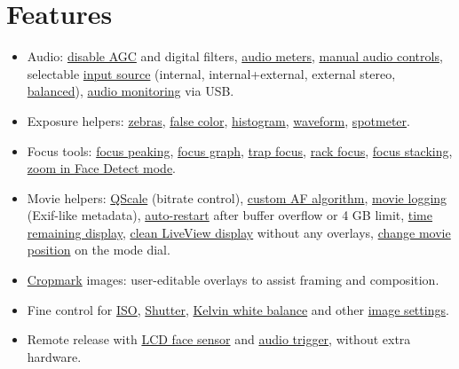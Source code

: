 \documentclass[a4paper,english]{article}
\begin{document}
{ \setlength{\parskip}{0.5mm}


\section*{Features%
  \label{features}%
}
%
\begin{itemize}

\item Audio: \hyperref[disable-agc]{disable AGC} and digital filters, \hyperref[audio-meters]{audio meters}, \hyperref[manual-audio-controls]{manual audio controls}, selectable \hyperref[input-source]{input source} (internal, internal+external, external stereo, \hyperref[balanced]{balanced}), \hyperref[audio-monitoring]{audio monitoring} via USB.

\item Exposure helpers: \hyperref[zebras]{zebras}, \hyperref[false-color]{false color}, \hyperref[histogram]{histogram}, \hyperref[waveform]{waveform}, \hyperref[spotmeter]{spotmeter}.

\item Focus tools: \hyperref[focus-peaking]{focus peaking}, \hyperref[focus-graph]{focus graph}, \hyperref[trap-focus]{trap focus}, \hyperref[rack-focus]{rack focus}, \hyperref[focus-stacking]{focus stacking}, \hyperref[zoom-in-face-detect-mode]{zoom in Face Detect mode}.

\item Movie helpers: \hyperref[qscale]{QScale} (bitrate control), \hyperref[custom-af-algorithm]{custom AF algorithm}, \hyperref[movie-logging]{movie logging} (Exif-like metadata), \hyperref[auto-restart]{auto-restart} after buffer overflow or 4 GB limit, \hyperref[time-remaining-display]{time remaining display}, \hyperref[clean-liveview-display]{clean LiveView display} without any overlays, \hyperref[change-movie-position]{change movie position} on the mode dial.

\item \hyperref[cropmark]{Cropmark} images: user-editable overlays to assist framing and composition.

\item Fine control for \hyperref[iso]{ISO}, \hyperref[shutter]{Shutter}, \hyperref[kelvin-white-balance]{Kelvin white balance} and other \hyperref[image-settings]{image settings}.

\item Remote release with \hyperref[lcd-face-sensor]{LCD face sensor} and \hyperref[audio-trigger]{audio trigger}, without extra hardware.


\end{itemize}}
\end{document}
